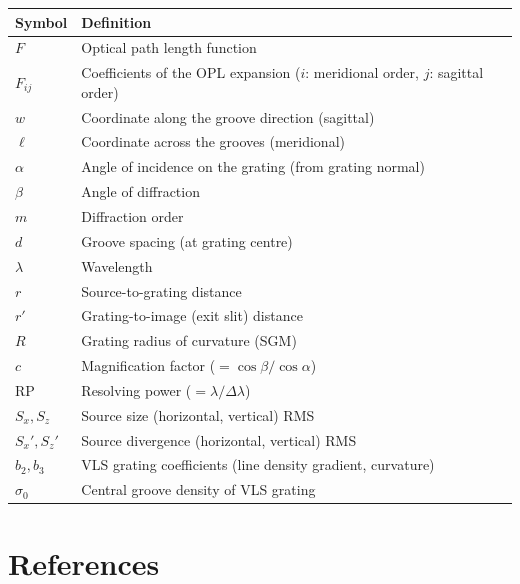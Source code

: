 \documentclass[12pt,a4paper]{article}
\newcommand{\al}{\alpha}
\newcommand{\be}{\beta}
\newcommand{\la}{\lambda}
\newcommand{\RP}{\mathrm{RP}}
\begin{document}
\begin{tabular}{lp{10cm}}
\toprule
\textbf{Symbol} & \textbf{Definition} \\
\midrule
$F$                    & Optical path length function \\
$F_{ij}$               & Coefficients of the OPL expansion ($i$: meridional order,
                          $j$: sagittal order) \\
$w$                    & Coordinate along the groove direction (sagittal) \\
$\ell$                 & Coordinate across the grooves (meridional) \\
$\al$                  & Angle of incidence on the grating (from grating normal) \\
$\be$                  & Angle of diffraction \\
$m$                    & Diffraction order \\
$d$                    & Groove spacing (at grating centre) \\
$\la$                  & Wavelength \\
$r$                    & Source-to-grating distance \\
$r'$                   & Grating-to-image (exit slit) distance \\
$R$                    & Grating radius of curvature (SGM) \\
$c$                    & Magnification factor ($= \cos\be/\cos\al$) \\
$\RP$                  & Resolving power ($= \la/\Delta\la$) \\
$S_x, S_z$             & Source size (horizontal, vertical) RMS \\
$S_x', S_z'$           & Source divergence (horizontal, vertical) RMS \\
$b_2, b_3$             & VLS grating coefficients (line density gradient, curvature) \\
$\sigma_0$             & Central groove density of VLS grating \\
\bottomrule
\end{tabular}

\bigskip
\section*{References}
\end{document}

